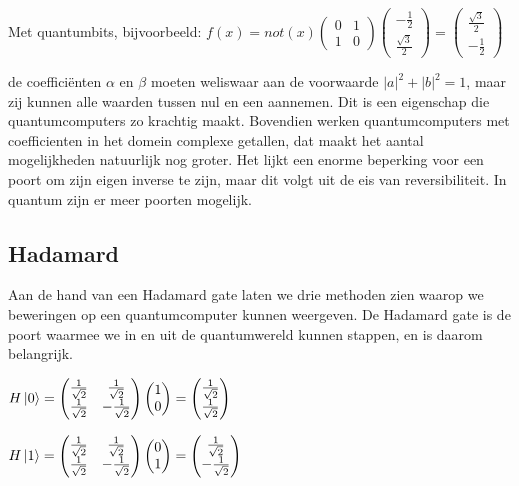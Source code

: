 \documentclass[../../main.tex]{subfiles}
\begin{document}
Met quantumbits, bijvoorbeeld:
$f(x)=not(x)
\begin{pmatrix}
0&1\\
1&0
\end{pmatrix}
\begin{pmatrix}
-\tfrac{1}{2}\\
\tfrac{\sqrt{3}}{2}
\end{pmatrix}
=
\begin{pmatrix}
\tfrac{\sqrt{3}}{2}\\
-\tfrac{1}{2}
\end{pmatrix}
$

de coeffici\"enten $\alpha$ en $\beta$ moeten weliswaar aan de voorwaarde $|a|^2+|b|^2=1$, maar zij kunnen alle waarden tussen nul en een aannemen. Dit is een eigenschap die quantumcomputers zo krachtig maakt. Bovendien werken quantumcomputers met coefficienten in het domein complexe getallen, dat maakt het aantal mogelijkheden  natuurlijk nog groter. 
Het lijkt een enorme beperking voor een poort om zijn eigen inverse te zijn, maar dit volgt uit de eis van reversibiliteit. In quantum zijn er meer poorten mogelijk. 

\subsection{Hadamard}

Aan de hand van een Hadamard gate laten we drie methoden zien waarop we beweringen  op een quantumcomputer kunnen weergeven.
De Hadamard gate is de poort waarmee we in en uit de quantumwereld kunnen stappen, en is daarom belangrijk. 

$H\ket{0}=
\begin{pmatrix} 
\tfrac{1}{\sqrt{2}} & \tfrac{1}{\sqrt{2}}  \\ 
\tfrac{1}{\sqrt{2}} & -\tfrac{1}{\sqrt{2}} 
\end{pmatrix} 
\begin{pmatrix} 
1  \\ 
0
\end{pmatrix} 
=
\begin{pmatrix} 
\tfrac{1}{\sqrt{2}}\\
\tfrac{1}{\sqrt{2}}
\end{pmatrix} 
$


$H\ket{1}=
\begin{pmatrix} 
\tfrac{1}{\sqrt{2}} & \tfrac{1}{\sqrt{2}}  \\ 
\tfrac{1}{\sqrt{2}} & -\tfrac{1}{\sqrt{2}} 
\end{pmatrix} 
\begin{pmatrix} 
0  \\ 
1
\end{pmatrix} 
=
\begin{pmatrix} 
\tfrac{1}{\sqrt{2}}\\
-\tfrac{1}{\sqrt{2}}
\end{pmatrix} 
$
\end{document}

